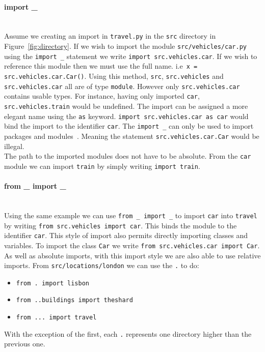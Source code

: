 \documentclass[12pt, titlepage]{article}
\begin{document}
\paragraph*{import \_} \mbox{} \\
Assume we creating an import in \texttt{travel.py} in the \texttt{src} directory in Figure~\ref{fig:directory}. If we wish to import the module \texttt{src/vehicles/car.py} using the \texttt{import \_} statement we write \texttt{import src.vehicles.car}. If we wish to reference this module then we must use the full name. i.e\ \texttt{x = src.vehicles.car.Car()}. Using this method, \texttt{src}, \texttt{src.vehicles} and \texttt{src.vehicles.car} all are of type \texttt{module}. However only \texttt{src.vehicles.car} contains usable types. For instance, having only imported \texttt{car}, \texttt{src.vehicles.train} would be undefined. The import can be assigned a more elegant name using the \texttt{as} keyword. \texttt{import src.vehicles.car as car} would bind the import to the identifier \texttt{car}. The \texttt{import \_} can only be used to import packages and modules~\cite{VanRossumImports}. Meaning the statement \texttt{src.vehicles.car.Car} would be illegal. \\
\indent The path to the imported modules does not have to be absolute. From the \texttt{car} module we can import \texttt{train} by simply writing \texttt{import train}.

\paragraph*{from \_ import \_} \mbox{} \\
Using the same example we can use \texttt{from \_ import \_} to import \texttt{car} into \texttt{travel} by writing \texttt{from src.vehicles import car}. This binds the module to the identifier \texttt{car}. This style of import also permits directly importing classes and variables. To import the class \texttt{Car} we write \texttt{from src.vehicles.car import Car}. \\
\indent As well as absolute imports, with this import style we are also able to use relative imports. From \texttt{src/locations/london} we can use the \texttt{.} to do:
\begin{itemize}
	\item \texttt{from . import lisbon}
	\item \texttt{from ..buildings import theshard}
	\item \texttt{from ... import travel}
\end{itemize}
With the exception of the first, each \texttt{.} represents one directory higher than the previous one.
\end{document}
